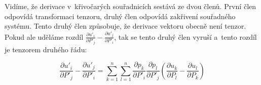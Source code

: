 Vidíme, že derivace v~křivočarých souřadnicích sestává ze dvou členů. První člen odpovídá transformaci tenzoru, druhý člen odpovídá zakřivení souřadného systému. Tento druhý člen způsobuje, že derivace vektoru obecně není tenzor. Pokud ale uděláme rozdíl \(\frac{\partial u'_i}{\partial P'_j} - \frac{\partial u'_j}{\partial P'_i}\), tak se tento druhý člen vyruší a~tento rozdíl je tenzorem druhého řádu:

\begin{equation}
\label{eq:tenzor_rozdil_derivaci_vektoru}
\frac{\partial u'_i}{\partial P'_j} - \frac{\partial u'_j}{\partial P'_i} =
\sum_{k=1}^n \sum_{l=1}^n \frac{\partial p_k}{\partial P'_i} \frac{\partial p_l}{\partial P'_j} \left(\frac{\partial u_k}{\partial P_l} - \frac{\partial u_l}{\partial P_k} \right) 
\end{equation}
